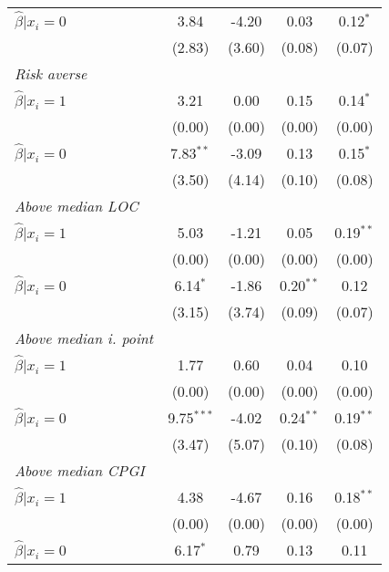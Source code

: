 \begin{table}[h]
{\begin{threeparttable}
\begin{tabular}{l*{4}{c}}
\hspace{0.5cm} \(\hat\beta|x_i=0\)&     3.84&    -4.20&     0.03&0.12$^{*}$\\
                &   (2.83)&   (3.60)&   (0.08)&   (0.07)\\
\textit{Risk averse}&         &         &         &         \\
\hspace{0.5cm} \(\hat\beta|x_i=1\)&     3.21&     0.00&     0.15&0.14$^{*}$\\
                &   (0.00)&   (0.00)&   (0.00)&   (0.00)\\
\hspace{0.5cm} \(\hat\beta|x_i=0\)&7.83$^{**}$&    -3.09&     0.13&0.15$^{*}$\\
                &   (3.50)&   (4.14)&   (0.10)&   (0.08)\\
\textit{Above median LOC}&         &         &         &         \\
\hspace{0.5cm} \(\hat\beta|x_i=1\)&     5.03&    -1.21&     0.05&0.19$^{**}$\\
                &   (0.00)&   (0.00)&   (0.00)&   (0.00)\\
\hspace{0.5cm} \(\hat\beta|x_i=0\)&6.14$^{*}$&    -1.86&0.20$^{**}$&     0.12\\
                &   (3.15)&   (3.74)&   (0.09)&   (0.07)\\
\textit{Above median i. point}&         &         &         &         \\
\hspace{0.5cm} \(\hat\beta|x_i=1\)&     1.77&     0.60&     0.04&     0.10\\
                &   (0.00)&   (0.00)&   (0.00)&   (0.00)\\
\hspace{0.5cm} \(\hat\beta|x_i=0\)&9.75$^{***}$&    -4.02&0.24$^{**}$&0.19$^{**}$\\
                &   (3.47)&   (5.07)&   (0.10)&   (0.08)\\
\textit{Above median CPGI}&         &         &         &         \\
\hspace{0.5cm} \(\hat\beta|x_i=1\)&     4.38&    -4.67&     0.16&0.18$^{**}$\\
                &   (0.00)&   (0.00)&   (0.00)&   (0.00)\\
\hspace{0.5cm} \(\hat\beta|x_i=0\)&6.17$^{*}$&     0.79&     0.13&     0.11\\

\end{tabular}
\end{threeparttable}}
\end{table}
